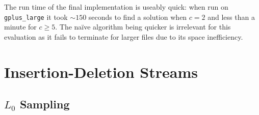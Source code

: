 \documentclass[11pt,twoside,a4paper]{report}
\begin{document}
\par The run time of the final implementation is useably quick: when run on \texttt{gplus\_large} it took $\sim\!\!150$ seconds to find a solution when $c=2$ and less than a minute for $c\geq5$. The naïve algorithm being quicker is irrelevant for this evaluation as it fails to terminate for larger files due to its space inefficiency.

\chapter{Insertion-Deletion Streams}

\section{$L_0$ Sampling}

\end{document}
